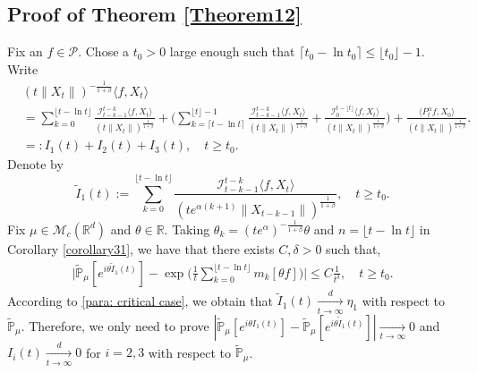 \documentclass[12pt]{amsart}
\theoremstyle{plain}
\theoremstyle{definition}
\numberwithin{equation}{section}
\begin{document}
\subsection{Proof of Theorem \ref{Theorem12}}
\label{sec: proof of thm 1.3}
    Fix an $f\in\mathcal{P}$. 
    Chose a $t_0 > 0$ large enough such that $\lceil t_0-\ln t_0\rceil \leq \lfloor t_0 \rfloor - 1.$
    Write
    \begin{align*}
        &(t\|X_t\|)^{-\frac{1}{1+\beta}}\langle f,X_t\rangle
        \\ &=\sum_{k=0}^{\lfloor t-\ln t \rfloor} \frac{\mathcal I_{t-k-1}^{t-k}\langle f ,X_t\rangle}{(t\|X_t\|)^{\frac{1}{1+\beta}}}+\Big(\sum_{k=\lceil t-\ln t \rceil}^{\lfloor t \rfloor-1} \frac{\mathcal I_{t-k-1}^{t-k}\langle f ,X_t\rangle}{(t\|X_t\|)^{\frac{1}{1+\beta}}}+\frac{\mathcal I_0^{t-\lfloor t \rfloor}\langle f ,X_t\rangle}{(t\|X_t\|)^{\frac{1}{1+\beta}}}\Big) + \frac{\langle P^\alpha_tf,X_0\rangle}{(t\|X_t\|)^{\frac{1}{1+\beta}}}.
        \\&=:I_1(t)+I_2(t) + I_3(t), 
        \quad t\geq t_0.
    \end{align*}
    Denote by
\[
    \tilde I_1(t)
    :=\sum_{k=0}^{\lfloor t-\ln t \rfloor}\frac{\mathcal I_{t-k-1}^{t-k}\langle f ,X_t\rangle}{(t e^{\alpha(k+1)}\|X_{t-k-1}\|)^{\frac{1}{1+\beta}}}, 
    \quad t\geq t_0.
\]
    Fix $\mu \in \mathcal M_c(\mathbb R^d)$ and $\theta\in \mathbb{R}$. Taking $\theta_k=(t e^{\alpha})^{-\frac{1}{1+\beta}} \theta $ and $n={\lfloor t-\ln t \rfloor}$ in Corollary \ref{corollary31}, we have that there exists $C,\delta>0$ such that,
\begin{align*}
        \Big|\mathbb{\tilde{P}}_{\mu} [e^{i\theta\tilde{I}_1(t)}]-\exp\Big(\frac{1}{t}\sum_{k=0}^{\lfloor t-\ln t \rfloor}m_k[\theta f]\Big)\Big|\leq C \frac{1}{t^{\delta}},
        \quad t\geq t_0.
\end{align*}
    According to \eqref{para: critical case}, we obtain that $\tilde{I}_1(t)\xrightarrow[t\to \infty]{d}\eta_1$ with respect to $\tilde {\mathbb P}_\mu$.
    Therefore, we only need to prove $|\mathbb{\tilde{P}}_{\mu}[e^{i\theta I_1(t)}]-\mathbb{\tilde{P}}_{\mu}[e^{i\theta\tilde{I}_1(t)}]|\xrightarrow[t\to \infty]{} 0$ and $I_i(t)\xrightarrow[t\to \infty]{d} 0$ for $i = 2,3$ with respect to $\tilde {\mathbb P}_\mu$.
\end{document}
